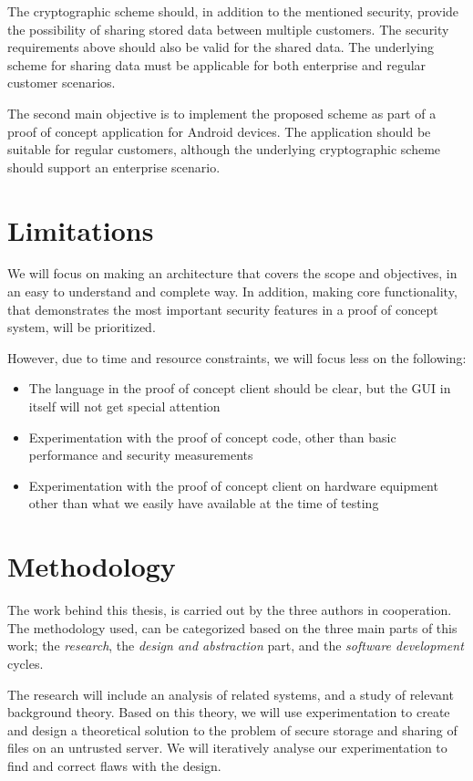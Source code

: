 \documentclass[pdftex,english,10pt,b5paper,twoside]{book}
\begin{document}
The cryptographic scheme should, in addition to the mentioned security, provide
the possibility of sharing stored data between multiple customers. The security
requirements above should also be valid for the shared data. The underlying scheme for
sharing data must be applicable for both enterprise and regular customer
scenarios.

The second main objective is to implement the proposed scheme as part of a
proof of concept application for Android devices. The application should be
suitable for regular customers, although the underlying cryptographic scheme
should support an enterprise scenario.

\section{Limitations}

We will focus on making an architecture that covers the scope and objectives,
in an easy to understand and complete way. In addition, making core
functionality, that demonstrates the most important security features in a proof
of concept system, will be prioritized.

However, due to time and resource constraints, we will focus less on the following:
\begin{itemize}
  \item The language in the proof of concept client should be clear, but the
    \ac{GUI} in itself will not get special attention
  \item Experimentation with the proof of concept code, other
    than basic performance and security measurements
  \item Experimentation with the proof of concept client on hardware equipment
    other than what we easily have available at the time of testing
\end{itemize}

\section{Methodology}

The work behind this thesis, is carried out by the three authors in
cooperation. The methodology used, can be categorized based on the three main
parts of this work; the \emph{research}, the \emph{design and abstraction} part,
and the \emph{software development} cycles.

The research will include an analysis of related systems, and a study of
relevant background theory. Based on this theory, we will use experimentation
to create and design a theoretical solution to the problem of secure storage
and sharing of files on an untrusted server. We will iteratively analyse our
experimentation to find and correct flaws with the design.
\end{document}
